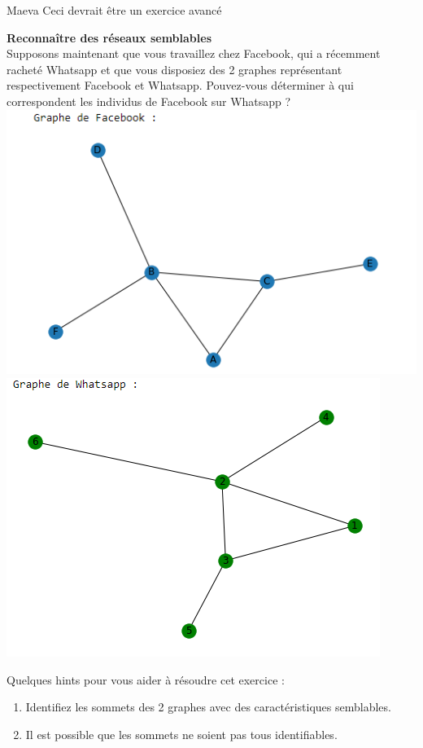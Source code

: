\begin{note}{Maeva}
    Ceci devrait être un exercice avancé
\end{note}
\begin{Exercice}[5 minutes] \textbf{Reconnaître des réseaux semblables}\\
    Supposons maintenant que vous travaillez chez Facebook, qui a récemment racheté Whatsapp et que vous disposiez des 2 graphes représentant respectivement Facebook et Whatsapp. Pouvez-vous déterminer à qui correspondent les individus de Facebook sur Whatsapp ?\\
    
    \includegraphics[]{Network2.PNG}\\
    \includegraphics[]{Network3.PNG}
    
    
    \begin{conseil}
    Quelques hints pour vous aider à résoudre cet exercice :
    \begin{enumerate}
        \item Identifiez les sommets des 2 graphes avec des caractéristiques semblables.
        \item Il est possible que les sommets ne soient pas tous identifiables.
    \end{enumerate}
        

\end{conseil}
\end{Exercice}
